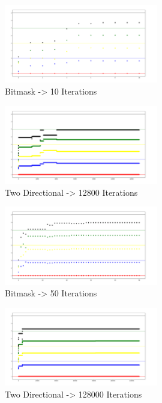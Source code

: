 \documentclass[12pt]{article}
\begin{document}
\begin{figure}[htbp]
\centering
\includegraphics[width=0.6\textwidth]{Bitmask_10.png}
\caption{Bitmask -> 10 Iterations}
\label{fig:result_4}
\end{figure}
\begin{figure}[htbp]
\centering
\includegraphics[width=0.6\textwidth]{Two_12800.png}
\caption{Two Directional -> 12800 Iterations}
\label{fig:result_5}
\end{figure}

\begin{figure}[htbp]
\centering
\includegraphics[width=0.6\textwidth]{Bitmask_50.png}
\caption{Bitmask -> 50 Iterations}
\label{fig:result_6}
\end{figure}
\begin{figure}[htbp]
\centering
\includegraphics[width=0.6\textwidth]{Two_128000.png}
\caption{Two Directional -> 128000 Iterations}
\label{fig:result_7}
\end{figure}
\end{document}
